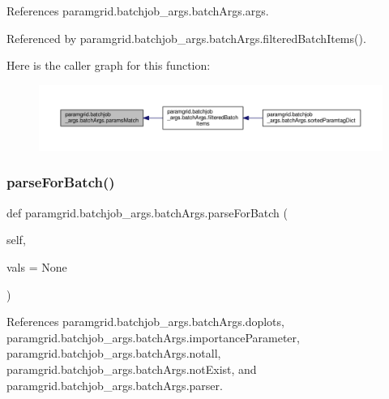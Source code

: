 References paramgrid.\+batchjob\+\_\+args.\+batch\+Args.\+args.



Referenced by paramgrid.\+batchjob\+\_\+args.\+batch\+Args.\+filtered\+Batch\+Items().

Here is the caller graph for this function\+:
\nopagebreak
\begin{figure}[H]
\begin{center}
\leavevmode
\includegraphics[width=350pt]{classparamgrid_1_1batchjob__args_1_1batchArgs_a1fb8df013bcf146d0800765b40f9b91d_icgraph}
\end{center}
\end{figure}
\mbox{\label{classparamgrid_1_1batchjob__args_1_1batchArgs_a37274b1efbc3629d80309590047a068f}} 
\subsubsection{\texorpdfstring{parse\+For\+Batch()}{parseForBatch()}}
{\footnotesize\ttfamily def paramgrid.\+batchjob\+\_\+args.\+batch\+Args.\+parse\+For\+Batch (\begin{DoxyParamCaption}\item[{}]{self,  }\item[{}]{vals = {\ttfamily None} }\end{DoxyParamCaption})}



References paramgrid.\+batchjob\+\_\+args.\+batch\+Args.\+doplots, paramgrid.\+batchjob\+\_\+args.\+batch\+Args.\+importance\+Parameter, paramgrid.\+batchjob\+\_\+args.\+batch\+Args.\+notall, paramgrid.\+batchjob\+\_\+args.\+batch\+Args.\+not\+Exist, and paramgrid.\+batchjob\+\_\+args.\+batch\+Args.\+parser.

\mbox{\label{classparamgrid_1_1batchjob__args_1_1batchArgs_a50b0de280c5e65044725927a0e174d3f}} 
